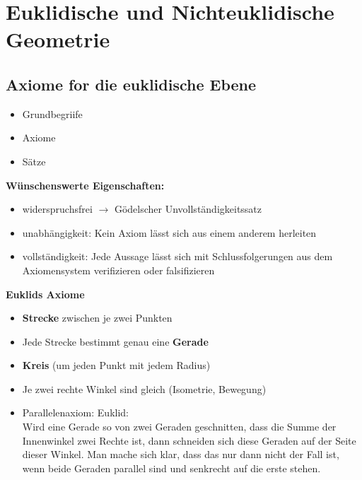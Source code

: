 \chapter{Euklidische und Nichteuklidische Geometrie}
\section{Axiome for die euklidische Ebene}

\begin{itemize}
    \item Grundbegriife
    \item Axiome
    \item Sätze
\end{itemize}

\textbf{Wünschenswerte Eigenschaften:}
\begin{itemize}
    \item widerspruchsfrei $\rightarrow$ Gödelscher Unvollständigkeitssatz
    \item unabhängigkeit: Kein Axiom lässt sich aus einem anderem herleiten
    \item vollständigkeit: Jede Aussage lässt sich mit Schlussfolgerungen 
          aus dem Axiomensystem verifizieren oder falsifizieren
\end{itemize}

\textbf{Euklids Axiome}
\begin{itemize}
    \item \textbf{Strecke} zwischen je zwei Punkten
    \item Jede Strecke bestimmt genau eine \textbf{Gerade}
    \item \textbf{Kreis} (um jeden Punkt mit jedem Radius)
    \item Je zwei rechte Winkel sind gleich (Isometrie, Bewegung)
    \item Parallelenaxiom: Euklid:\\
        Wird eine Gerade so von zwei Geraden geschnitten, dass die 
        Summe der Innenwinkel zwei Rechte ist, dann schneiden sich
        diese Geraden auf der Seite dieser Winkel.
        Man mache sich klar, dass das nur dann nicht der Fall ist, 
        wenn beide Geraden parallel sind und senkrecht auf die erste stehen.
\end{itemize}

